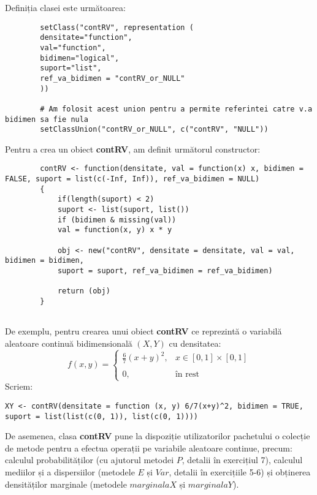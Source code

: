\documentclass[12pt]{article}
\begin{document}
	Definiția clasei este următoarea:
	\begin{lstlisting}
		setClass("contRV", representation (
		densitate="function",
		val="function",
		bidimen="logical",
		suport="list",
		ref_va_bidimen = "contRV_or_NULL"
		))
		
		# Am folosit acest union pentru a permite referintei catre v.a bidimen sa fie nula
		setClassUnion("contRV_or_NULL", c("contRV", "NULL"))
	\end{lstlisting}\pagebreak
	
	Pentru a crea un obiect \textbf{contRV}, am definit următorul constructor:
	\begin{lstlisting}
		contRV <- function(densitate, val = function(x) x, bidimen = FALSE, suport = list(c(-Inf, Inf)), ref_va_bidimen = NULL)
		{
			if(length(suport) < 2)
			suport <- list(suport, list())
			if (bidimen & missing(val))
			val = function(x, y) x * y
			
			obj <- new("contRV", densitate = densitate, val = val, bidimen = bidimen,
			suport = suport, ref_va_bidimen = ref_va_bidimen)
			
			return (obj)
		}
		
	\end{lstlisting}

	De exemplu, pentru crearea unui obiect \textbf{contRV} ce reprezintă o variabilă aleatoare continuă bidimensională $(X, Y)$ cu densitatea:
	\[ 
	f(x, y)= \left\{
	\begin{array}{ll}
		\frac{6}{7}(x+y)^2, & x \in [0, 1] \times [0, 1] \\\\
		0,				   & \text{în rest}
	\end{array} 
	\right. 
	\]
	Scriem:
	\begin{lstlisting}[numbers=none]
		XY <- contRV(densitate = function (x, y) 6/7(x+y)^2, bidimen = TRUE, suport = list(list(c(0, 1)), list(c(0, 1))))
	\end{lstlisting}\vspace*{1\baselineskip}
	
	
	De asemenea, clasa \textbf{contRV} pune la dispoziție utilizatorilor pachetului o colecție de metode pentru a efectua operații pe variabile aleatoare continue, precum: calculul probabilităților (cu ajutorul metodei $P$, detalii în exercițiul 7), calculul mediilor și a dispersiilor (metodele $E$ și $Var$, detalii în exercițiile 5-6) și obținerea densităților marginale (metodele $marginalaX$ și $marginalaY$).
\end{document}
